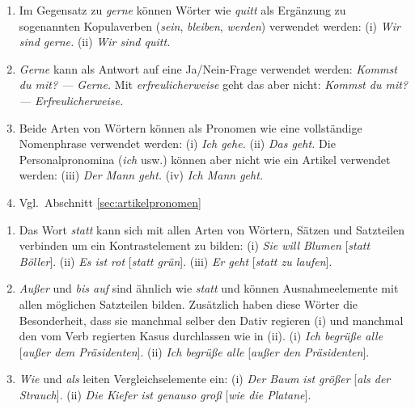 
\begin{sloppypar}

\begin{enumerate}\Lf
  \item Im Gegensatz zu \textit{gerne} können Wörter wie \textit{quitt} als Ergänzung zu sogenannten Kopulaverben (\textit{sein}, \textit{bleiben}, \textit{werden}) verwendet werden:
    (i) \Ast \textit{Wir sind gerne.} (ii) \textit{Wir sind quitt.}
  \item \textit{Gerne} kann als Antwort auf eine Ja\slash Nein-Frage verwendet werden:
    \textit{Kommst du mit? --- Gerne.}
    Mit \textit{erfreulicherweise} geht das aber nicht:
    \textit{Kommst du mit? --- \Ast Erfreulicherweise.}
  \item Beide Arten von Wörtern können als Pronomen wie eine vollständige Nomenphrase verwendet werden:
    (i) \textit{Ich gehe.}
    (ii) \textit{Das geht.}
    Die Personalpronomina (\textit{ich} usw.) können aber nicht wie ein Artikel verwendet werden:
    (iii) \textit{Der Mann geht.}
    (iv) \Ast \textit{Ich Mann geht.}
  \item Vgl.\ Abschnitt \ref{sec:artikelpronomen}
\end{enumerate}

\end{sloppypar}


\begin{enumerate}\Lf
  \item Das Wort \textit{statt} kann sich mit allen Arten von Wörtern, Sätzen und Satzteilen verbinden um ein Kontrastelement zu bilden:
    (i) \textit{Sie will Blumen} [\textit{statt Böller}].
    (ii) \textit{Es ist rot} [\textit{statt grün}].
    (iii) \textit{Er geht} [\textit{statt zu laufen}]. 
  \item \textit{Außer} und \textit{bis auf} sind ähnlich wie \textit{statt} und können Ausnahmeelemente mit allen möglichen Satzteilen bilden.
    Zusätzlich haben diese Wörter die Besonderheit, dass sie manchmal selber den Dativ regieren (i) und manchmal den vom Verb regierten Kasus durchlassen wie in (ii).
    (i) \textit{Ich begrüße alle} [\textit{außer dem Präsidenten}].
    (ii) \textit{Ich begrüße alle} [\textit{außer den Präsidenten}].
  \item \textit{Wie} und \textit{als} leiten Vergleichselemente ein:
    (i) \textit{Der Baum ist größer} [\textit{als der Strauch}].
    (ii) \textit{Die Kiefer ist genauso groß} [\textit{wie die Platane}].
\end{enumerate}

